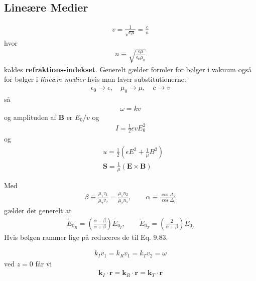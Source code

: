 \documentclass[a4paper]{article}
\begin{document}
    \subsection{Lineære Medier}
    \begin{align*}
        \boxed{v = \frac{1}{\sqrt{\epsilon \mu } } = \frac{c}{n}}\tag{9.69}
    \end{align*}
    hvor \begin{align*}
        n \equiv \sqrt{\frac{\epsilon \mu }{\epsilon _0 \mu _0}} \tag{9.70}
    \end{align*}
    kaldes \textbf{refraktions-indekset}. Generelt gælder formler for bølger i vakuum også for bølger i \textit{lineære medier} hvis man laver substitutionerne: \begin{align*}
        \epsilon _0 \to \epsilon, \quad \mu _0 \to \mu, \quad c \to v
    \end{align*}
    så \begin{align*}
        \omega = kv
    \end{align*}
    og amplituden af \(\mathbf{B}\) er \(E_0/v\) og \begin{align*}
        I = \frac{1}{2} \epsilon v E_0 ^2\tag{9.74}
    \end{align*}
    og \begin{align*} 
        &u = \frac{1}{2} \left( \epsilon E^{2} + \frac{1}{\mu } B^{2}  \right) \tag{9.72}\\
        &\mathbf{S} = \frac{1}{\mu } \left( \mathbf{E} \times \mathbf{B} \right) \tag{9.73}
    \end{align*}

    Med \begin{align*}
        \beta \equiv \frac{\mu _1 v_1}{\mu _2 v_2} = \frac{\mu _1 n_2}{\mu _2 n_1}, \qquad \alpha \equiv \frac{\cos \Delta_T}{\cos \Delta _I}
    \end{align*}
    gælder det generelt at \begin{align*}
        \boxed{\tilde{E}_{0_R} = \left( \frac{\alpha - \beta }{\alpha + \beta }\right) \tilde{E}_{0_I}, \qquad \tilde{E}_{0_T} = \left( \frac{2}{\alpha + \beta }\right) \tilde{E}_{0_I}} \tag{9.110}
    \end{align*}
    Hvis bølgen rammer lige på reduceres de til Eq. 9.83.

    \begin{align*}
        k_I v_1 = k_R v_1 = k_T v_2 = \omega \tag{9.93}
    \end{align*}
    ved \(z = 0\) får vi \begin{align*}
        \mathbf{k}_I \cdot \mathbf{r} = \mathbf{k}_R \cdot \mathbf{r} = \mathbf{k}_T \cdot \mathbf{r} \tag{9.95}
    \end{align*} 
\end{document}
